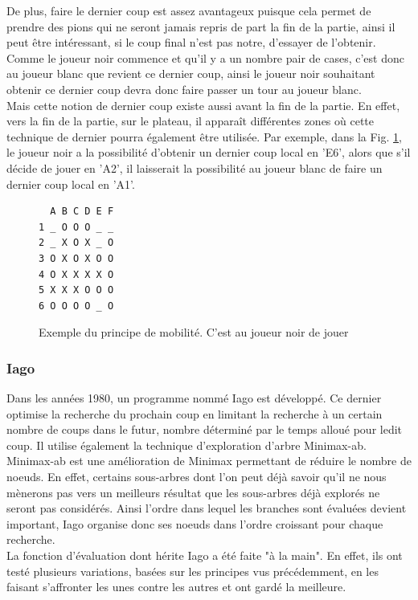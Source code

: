 \documentclass[10pt,a4paper]{article}
\begin{document}
\begin{itemize}
De plus, faire le dernier coup est assez avantageux puisque cela permet de prendre des pions qui ne seront jamais repris de part la fin de la partie, ainsi il peut être intéressant, si le coup final n'est pas notre, d'essayer de l'obtenir. Comme le joueur noir commence et qu'il y a un nombre pair de cases, c'est donc au joueur blanc que revient ce dernier coup, ainsi le joueur noir souhaitant obtenir ce dernier coup devra donc faire passer un tour au joueur blanc.\\

Mais cette notion de dernier coup existe aussi avant la fin de la partie. En effet, vers la fin de la partie, sur le plateau, il apparaît différentes zones où cette technique de dernier pourra également être utilisée. Par exemple, dans la Fig. \ref{fig:mobilité}, le joueur noir a la possibilité d'obtenir un dernier coup local en 'E6', alors que s'il décide de jouer en 'A2', il laisserait la possibilité au joueur blanc de faire un dernier coup local en 'A1'.
\begin{figure}[H]    
\centering
\begin{BVerbatim}
  A B C D E F
1 _ O O O _ _
2 _ X O X _ O
3 O X O X O O
4 O X X X X O
5 X X X O O O
6 O O O O _ O
\end{BVerbatim}
\caption {Exemple du principe de mobilité. C'est au joueur noir de jouer\label{fig:mobilité}}
\end{figure}
\end{itemize}

\subsubsection {Iago}

Dans les années 1980, un programme nommé Iago\cite{Ros81} est développé. Ce dernier optimise la recherche du prochain coup en limitant la recherche à un certain nombre de coups dans le futur, nombre déterminé par le temps alloué pour ledit coup. Il utilise également la technique d'exploration d'arbre Minimax-ab. Minimax-ab est une amélioration de Minimax permettant de réduire le nombre de noeuds. En effet, certains sous-arbres dont l'on peut déjà savoir qu'il ne nous mènerons pas vers un meilleurs résultat que les sous-arbres déjà explorés ne seront pas considérés. Ainsi l'ordre dans lequel les branches sont évaluées devient important, Iago organise donc ses noeuds dans l'ordre croissant pour chaque recherche.\\

La fonction d'évaluation dont hérite Iago a été faite "à la main". En effet, ils ont testé plusieurs variations, basées sur les principes vus précédemment, en les faisant s'affronter les unes contre les autres et ont gardé la meilleure.
\end{document}

